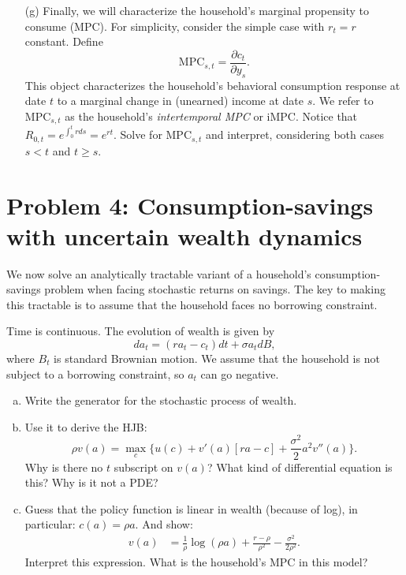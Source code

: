 \documentclass[11pt]{extarticle}
\theoremstyle{plain}
\theoremstyle{definition}
\begin{document}
\begin{enumerate}
\item [(g)] Finally, we will characterize the household's marginal propensity to consume (MPC). For simplicity, consider the simple case with $r_t = r$ constant. Define 
\begin{equation*}
	\text{MPC}_{s, t} = \frac{\partial c_t}{\partial y_s}. 
\end{equation*}
This object characterizes the household's behavioral consumption response at date $t$ to a marginal change in (unearned) income at date $s$. We refer to $\text{MPC}_{s, t}$ as the household's \textit{intertemporal MPC} or iMPC. Notice that $R_{0, t} = e^{\int_0^t r ds } = e^{ r t}$. Solve for $\text{MPC}_{s, t}$ and interpret, considering both cases $s < t$ and $t \geq s$. 

\end{enumerate}




\vspace{5mm}
\section*{Problem 4: Consumption-savings with uncertain wealth dynamics}

We now solve an analytically tractable variant of a household's consumption-savings problem when facing stochastic returns on savings. The key to making this tractable is to assume that the household faces no borrowing constraint.


Time is continuous. The evolution of wealth is given by 
\begin{equation*}
	da_t = (r a_t - c_t)dt + \sigma a_t dB,
\end{equation*}
where $B_t$ is standard Brownian motion. We assume that the household is not subject to a borrowing constraint, so $a_t$ can go negative. 


\begin{enumerate}[(a)]
\item Write the generator for the stochastic process of wealth. 

\item Use it to derive the HJB:
\begin{equation*}
	\rho v(a) = \max_c \bigg\{ u(c) + v'(a)[ra -c] + \frac{\sigma^2}{2} a^2 v''(a) \bigg\}. 
\end{equation*}
Why is there no $t$ subscript on $v(a)$? What kind of differential equation is this? Why is it not a PDE?

\item Guess that the policy function is linear in wealth (because of log), in particular: $c(a) = \rho a$. And show: 
\begin{align*}
	v(a) &= \frac{1}{\rho} \log(\rho a) + \frac{r - \rho}{\rho^2} - \frac{\sigma^2}{2\rho^2}.
\end{align*} 
Interpret this expression. What is the household's MPC in this model? 

\end{enumerate}
\end{document}
